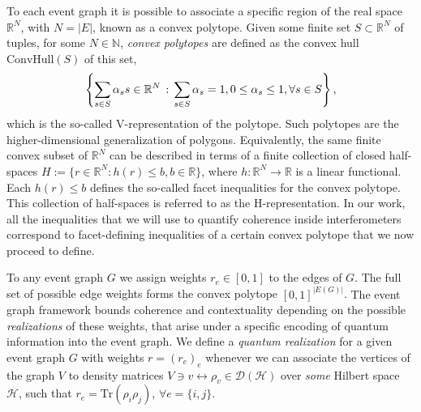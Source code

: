 \documentclass[a4paper,twocolumn,11pt,accepted=2024-01-17]{quantumarticle}
\begin{document}
{ To each event graph it is possible to associate a specific region of the real space $\mathbb{R}^N$, with $N=|E|$, known as a convex polytope. Given some finite set $S\subset \mathbb{R}^N$ of tuples, for some $N \in \mathbb{N}$, \textit{convex polytopes} are defined as the convex hull $\text{ConvHull}(S)$ of this set, $$\left\{\sum_{s \in S}\alpha_s s \in \mathbb{R}^N \, : \, \sum_{s \in S}\alpha_s = 1, \\ 0 \leq \alpha_s \leq 1, \forall s \in S\right\},$$ which is the so-called V-representation of the polytope. Such polytopes are the higher-dimensional generalization of polygons. Equivalently, the same finite convex subset of $\mathbb{R}^N$ can be described in terms of a finite collection of  closed half-spaces $H := \{r \in \mathbb{R}^N: h(r) \leq b, b \in \mathbb{R}\}$, where $h:\mathbb{R}^N \to \mathbb{R}$ is a linear functional. Each $h(r) \leq b$ defines the so-called facet inequalities for the convex polytope. This collection of half-spaces is referred to as the H-representation. In our work, all the inequalities that we will use to quantify coherence inside interferometers correspond to facet-defining inequalities of a certain convex polytope that we now proceed to define. }

To any event graph $G$ we assign weights $r_e \in [0,1]$ to the edges of $G$. The full set of possible edge {weights} forms the  convex polytope $[0,1]^{|E(G)|}$. {The event graph framework bounds coherence and contextuality depending on the possible \textit{realizations} of these weights, that arise under a specific encoding of quantum information into the event graph. We define a \textit{quantum realization} for a given event graph $G$ with weights $r=(r_e)_e$ whenever we can associate the vertices of the graph $V$ to density matrices $V \ni v \leftrightarrow \rho_v \in \mathcal{D}(\mathcal{H})$ over \textit{some} Hilbert space $\mathcal{H}$, such that $r_{e} = \text{Tr}(\rho_i\rho_j)$,  $\forall e=\{i,j\}$. } 
\end{document}
